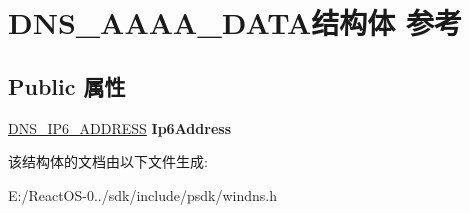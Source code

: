 \hypertarget{struct_d_n_s___a_a_a_a___d_a_t_a}{}\section{D\+N\+S\+\_\+\+A\+A\+A\+A\+\_\+\+D\+A\+T\+A结构体 参考}
\label{struct_d_n_s___a_a_a_a___d_a_t_a}
\subsection*{Public 属性}
\begin{DoxyCompactItemize}
\item 
\mbox{\label{struct_d_n_s___a_a_a_a___d_a_t_a_a193a090ee788b5ba3a2bd1356126f7d9}} 
\hyperlink{struct_i_p6___a_d_d_r_e_s_s}{D\+N\+S\+\_\+\+I\+P6\+\_\+\+A\+D\+D\+R\+E\+SS} {\bfseries Ip6\+Address}
\end{DoxyCompactItemize}


该结构体的文档由以下文件生成\+:\begin{DoxyCompactItemize}
\item 
E\+:/\+React\+O\+S-\/0../sdk/include/psdk/windns.\+h\end{DoxyCompactItemize}
